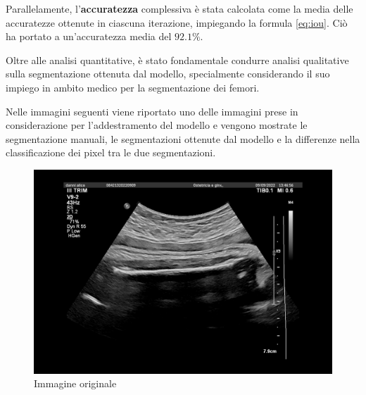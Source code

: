 Parallelamente, l'\textbf{accuratezza} complessiva è stata calcolata come la media delle accuratezze
ottenute in ciascuna iterazione, impiegando la formula \ref{eq:iou}. Ciò ha portato a un'accuratezza
media del \textbf{$92.1\%$}.

Oltre alle analisi quantitative, è stato fondamentale condurre analisi qualitative sulla
segmentazione ottenuta dal modello, specialmente considerando il suo impiego in ambito medico per la
segmentazione dei femori.

Nelle immagini seguenti viene riportato uno delle immagini prese in considerazione per
l'addestramento del modello e vengono mostrate le segmentazione manuali, le segmentazioni ottenute
dal modello e la differenze nella classificazione dei pixel tra le due segmentazioni.


\begin{figure}[!ht]
    \centering
    \includegraphics[width=0.7\columnwidth]{Immagini/image.png}
    \caption{Immagine originale}
    \label{fig:immagine originale}
\end{figure}


